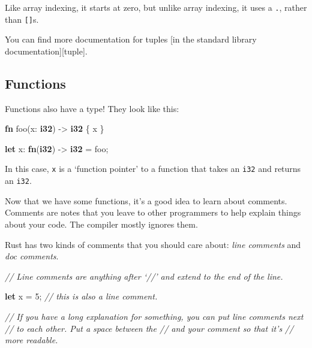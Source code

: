 \documentclass[a4paper,]{book}
\newenvironment{Shaded}{\begin{snugshade}}{\end{snugshade}}
\newcommand{\KeywordTok}[1]{\textcolor[rgb]{0.13,0.29,0.53}{\textbf{{#1}}}}
\newcommand{\DecValTok}[1]{\textcolor[rgb]{0.00,0.00,0.81}{{#1}}}
\newcommand{\CommentTok}[1]{\textcolor[rgb]{0.56,0.35,0.01}{\textit{{#1}}}}
\newcommand{\NormalTok}[1]{{#1}}
\begin{document}
Like array indexing, it starts at zero, but unlike array indexing, it
uses a \texttt{.}, rather than \texttt{{[}{]}}s.

You can find more documentation for tuples {[}in the standard library
documentation{]}{[}tuple{]}.

\subsection{Functions}\label{functions}

Functions also have a type! They look like this:

\begin{Shaded}
\begin{Highlighting}[]
\KeywordTok{fn} \NormalTok{foo(x: }\KeywordTok{i32}\NormalTok{) -> }\KeywordTok{i32} \NormalTok{\{ x \}}

\KeywordTok{let} \NormalTok{x: }\KeywordTok{fn}\NormalTok{(}\KeywordTok{i32}\NormalTok{) -> }\KeywordTok{i32} \NormalTok{= foo;}
\end{Highlighting}
\end{Shaded}

In this case, \texttt{x} is a `function pointer' to a function that
takes an \texttt{i32} and returns an \texttt{i32}.


Now that we have some functions, it's a good idea to learn about
comments. Comments are notes that you leave to other programmers to help
explain things about your code. The compiler mostly ignores them.

Rust has two kinds of comments that you should care about: \emph{line
comments} and \emph{doc comments}.

\begin{Shaded}
\begin{Highlighting}[]
\CommentTok{// Line comments are anything after ‘//’ and extend to the end of the line.}

\KeywordTok{let} \NormalTok{x = }\DecValTok{5}\NormalTok{; }\CommentTok{// this is also a line comment.}

\CommentTok{// If you have a long explanation for something, you can put line comments next}
\CommentTok{// to each other. Put a space between the // and your comment so that it’s}
\CommentTok{// more readable.}
\end{Highlighting}
\end{Shaded}
\end{document}
